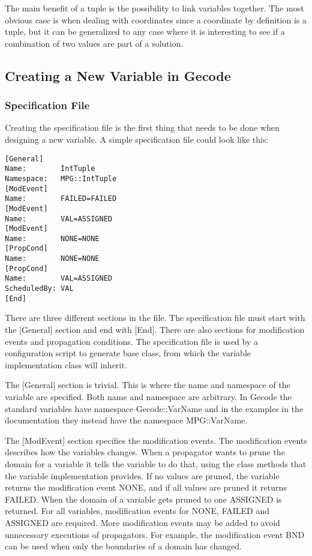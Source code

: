 \documentclass[a4paper,11pt]{article}
\begin{document}
The main benefit of a tuple is the possibility to link variables together. The most obvious case is when dealing with coordinates since a coordinate by definition is a tuple, but it can be generalized to any case where it is interesting to see if a combination of two values are part of a solution.

\newpage

\subsection{Creating a New Variable in Gecode}
\subsubsection{Specification File}
Creating the specification file is the first thing that needs to be done when designing a new variable.  A simple specification file could look like this:

\begin{lstlisting}[frame=single]
[General]
Name:        IntTuple
Namespace:   MPG::IntTuple
[ModEvent]
Name:        FAILED=FAILED
[ModEvent]
Name:        VAL=ASSIGNED
[ModEvent]
Name:        NONE=NONE
[PropCond]
Name:        NONE=NONE
[PropCond]
Name:        VAL=ASSIGNED
ScheduledBy: VAL
[End]
\end{lstlisting}
There are three different sections in the file. The specification file must start with the [General] section and end with [End]. There are also sections for modification events and propagation conditions. The specification file is used by a configuration script to generate base class, from which the variable implementation class will inherit.

The [General] section is trivial. This is where the name and namespace of the variable are specified. Both name and namespace are arbitrary. In Gecode the standard variables have namespace Gecode::VarName and in the examples in the documentation they instead have the namespace MPG::VarName.

The [ModEvent] section specifies the modification events. The modification events describes how the variables changes. When a propagator wants to prune the domain for a variable it tells the variable to do that, using the class methods that the variable implementation provides. If no values are pruned, the variable returns the modification event NONE, and if all values are pruned it returns FAILED. When the domain of a variable gets pruned to one ASSIGNED is returned. For all variables, modification events for NONE, FAILED and ASSIGNED are required. More modification events may be added to avoid unnecessary executions of propagators. For example, the modification event BND can be used when only the boundaries of a domain has changed.
\end{document}
